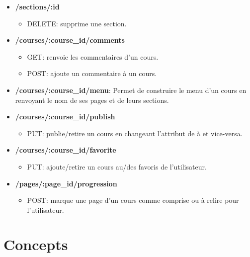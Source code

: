 \documentclass[a4paper,10pt,twoside]{sphinxmanual}
\begin{document}
\begin{itemize}
\begin{itemize}
\end{itemize}

\item {} 
\textbf{/sections/:id}
\begin{itemize}
\item {} 
DELETE: supprime une section.

\end{itemize}

\item {} 
\textbf{/courses/:course\_id/comments}
\begin{itemize}
\item {} 
GET: renvoie les commentaires d'un cours.

\item {} 
POST: ajoute un commentaire à un cours.

\end{itemize}

\item {} 
\textbf{/courses/:course\_id/menu}: Permet de construire le menu d'un cours en renvoyant le nom de ses pages et de leurs sections.

\item {} 
\textbf{/courses/:course\_id/publish}
\begin{itemize}
\item {} 
PUT: publie/retire un cours en changeant l'attribut  de  à  et vice-versa.

\end{itemize}

\item {} 
\textbf{/courses/:course\_id/favorite}
\begin{itemize}
\item {} 
PUT: ajoute/retire un cours au/des favoris de l'utilisateur.

\end{itemize}

\item {} 
\textbf{/pages/:page\_id/progression}
\begin{itemize}
\item {} 
POST: marque une page d'un cours comme comprise ou à relire pour l'utilisateur.

\end{itemize}

\end{itemize}


\section{Concepts}
\label{guide:concepts}
\end{document}
